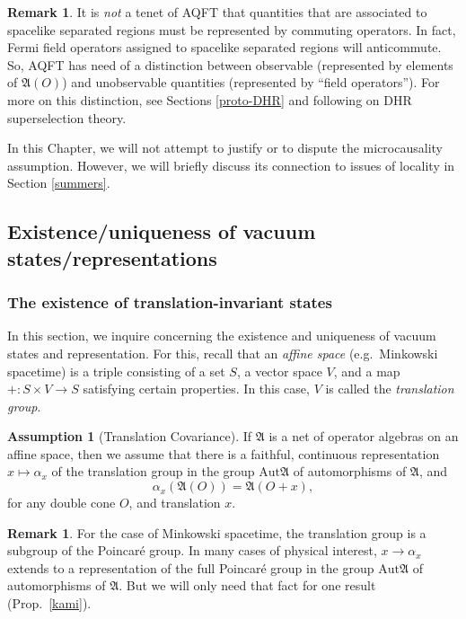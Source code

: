 \documentclass[12pt]{article}
\newcommand{\alg}[1]{\mathfrak{#1}}
\theoremstyle{definition}
\newtheorem{assumption}{Assumption}
\theoremstyle{definition}
\newtheorem{note}[thm]{Remark}
\theoremstyle{remark}
\def\al#1{{\mathfrak #1}}
\def\a{\alpha} \def\b{\beta} \def\g{\gamma} \def\d{\delta}
\newcommand{\Aut}{\mathrm{Aut}}
\begin{document}
\begin{note} It is \emph{not} a tenet of AQFT that quantities that are associated to
  spacelike separated regions must be represented by commuting operators.  In fact,
  Fermi field operators assigned to spacelike separated regions will anticommute.
  So, AQFT has need of a distinction between observable (represented by elements of
  $\alg{A}(O)$) and unobservable quantities (represented by ``field operators'').
  For more on this distinction, see Sections \ref{proto-DHR} and following on DHR
  superselection theory.
\end{note}


In this Chapter, we will not attempt to justify or to dispute the microcausality
assumption.  However, we will briefly discuss its connection to issues of locality in
Section \ref{summers}.

\subsection{Existence/uniqueness of vacuum states/representations}

\label{uniq}


\subsubsection{The existence of translation-invariant states}

In this section, we inquire concerning the existence and uniqueness of
vacuum states and representation.  For this, recall that an
\emph{affine space} (e.g.\ Minkowski spacetime) is a triple consisting
of a set $S$, a vector space $V$, and a map $+:S\times V\to S$
satisfying certain properties.  In this case, $V$ is called the
\emph{translation group}.

\begin{assumption}[Translation Covariance] If $\alg{A}$ is a net of
  operator algebras on an affine space, then we assume that there is a
  faithful, continuous representation $x\mapsto \a _x$ of the
  translation group in the group $\Aut \alg{A}$ of automorphisms of
  $\alg{A}$, and $$ \a _x(\alg{A}(O))=\alg{A}(O+x) ,$$ for any double
  cone $O$, and translation $x$.
\end{assumption}

\begin{note} For the case of Minkowski spacetime, the translation
  group is a subgroup of the Poincar{\'e} group.  In many cases of
  physical interest, $x\to \a _x$ extends to a representation of the
  full Poincar{\'e} group in the group $\Aut \al A$ of automorphisms
  of $\al A$.  But we will only need that fact for one result (Prop.\
  \ref{kami}).
\end{note}
\end{document}
